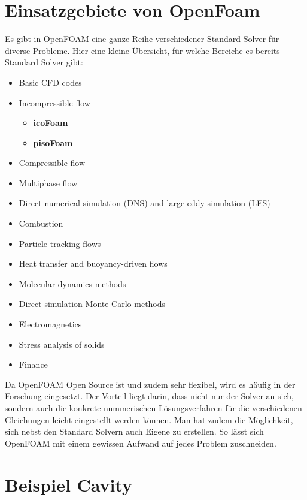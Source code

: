 \begin{refsection}
\section{Einsatzgebiete von OpenFoam}
Es gibt in OpenFOAM eine ganze Reihe verschiedener Standard Solver für diverse Probleme. Hier eine kleine Übersicht, für welche Bereiche es bereits Standard Solver gibt:
\begin{itemize}
\setlength{\itemsep}{2pt}
\setlength{\parsep}{2pt}
\item Basic CFD codes  
\item Incompressible flow 
\begin{itemize}
\item \textbf{icoFoam}
\item \textbf{pisoFoam}
\end{itemize}
\item Compressible flow 
\item Multiphase flow
\item Direct numerical simulation (DNS) and large eddy simulation (LES)
\item Combustion
\item Particle-tracking flows
\item Heat transfer and buoyancy-driven flows
\item Molecular dynamics methods
\item Direct simulation Monte Carlo methods
\item Electromagnetics
\item Stress analysis of solids
\item Finance
\end{itemize} 

Da OpenFOAM Open Source ist und zudem sehr flexibel, wird es häufig in der Forschung eingesetzt. Der Vorteil liegt darin, dass nicht nur der Solver an sich, sondern auch die konkrete nummerischen Lösungsverfahren für die verschiedenen Gleichungen leicht eingestellt werden können. Man hat zudem die Möglichkeit, sich nebst den Standard Solvern auch Eigene zu erstellen. So lässt sich OpenFOAM mit einem gewissen Aufwand auf jedes Problem zuschneiden. \cite{of} 

\section{Beispiel Cavity}

\end{refsection}
